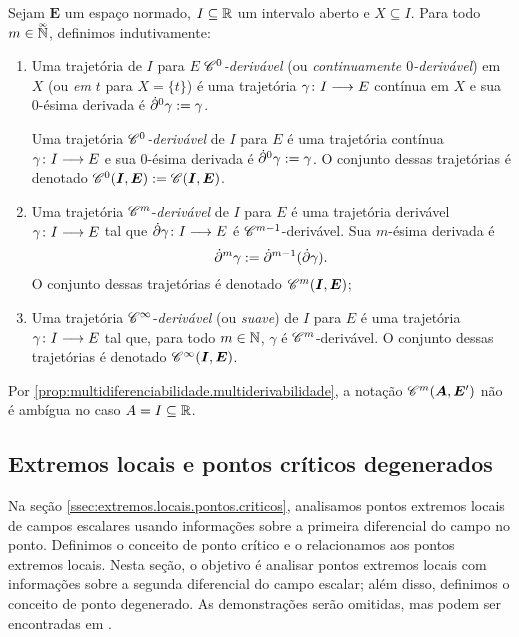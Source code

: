 \begin{definition}
Sejam $\bm E$ um espaço normado, $I \subseteq \mathbb{R}$ um intervalo aberto e $X \subseteq I$. Para todo $m \in \accentset{\infty}{\mathbb{N}}$, definimos indutivamente:
	\begin{enumerate}
	\item Uma trajetória de $I$ para $E$ \emph{$\mathscr{C}^0$-derivável} (ou \emph{continuamente $0$-derivável}) em $X$ (ou \emph{em $t$} para $X=\{t\}$) é uma trajetória $\gamma\colon \allowbreak I \longrightarrow E$ contínua em $X$ e sua $0$-ésima derivada é $\dot{\partial}^0 \gamma := \gamma$.

	Uma trajetória \emph{$\mathscr{C}^0$-derivável} de $I$ para $E$ é uma trajetória contínua $\gamma\colon \allowbreak I \longrightarrow E$ e sua $0$-ésima derivada é $\dot{\partial}^0 \gamma := \gamma$. O conjunto dessas trajetórias é denotado $\mathscr{C}^0(\bm I,\bm E) := \mathscr{C}(\bm I,\bm E)$.

	\item

	Uma trajetória $\mathscr{C}^m$-\emph{derivável} de $I$ para $E$ é uma trajetória derivável $\gamma\colon \allowbreak I \longrightarrow E$ tal que $\dot{\partial} \gamma\colon \allowbreak I \longrightarrow E$ é $\mathscr{C}^{m-1}$-derivável. Sua $m$-ésima derivada é
		\begin{equation*}
		\dot{\partial}^m \gamma := \dot{\partial}^{m-1} (\dot{\partial} \gamma).
		\end{equation*}
	O conjunto dessas trajetórias é denotado $\mathscr{C}^m(\bm I,\bm E)$;

	\item

	Uma trajetória $\mathscr{C}^\infty$-\emph{derivável} (ou \emph{suave}) de $I$ para $E$ é uma trajetória $\gamma\colon \allowbreak I \longrightarrow E$ tal que, para todo $m \in \mathbb{N}$, $\gamma$ é $\mathscr{C}^{m}$-derivável. O conjunto dessas trajetórias é denotado $\mathscr{C}^\infty(\bm I,\bm E)$.
	\end{enumerate}
\end{definition}

Por \ref{prop:multidiferenciabilidade.multiderivabilidade}, a notação $\mathscr{C}^m(\bm A,\bm E')$ não é ambígua no caso $A = I \subseteq \mathbb{R}$.





\subsection{Extremos locais e pontos críticos degenerados}

Na seção \ref{ssec:extremos.locais.pontos.criticos}, analisamos pontos extremos locais de campos escalares usando informações sobre a primeira diferencial do campo no ponto. Definimos o conceito de ponto crítico e o relacionamos aos pontos extremos locais. Nesta seção, o objetivo é analisar pontos extremos locais com informações sobre a segunda diferencial do campo escalar; além disso, definimos o conceito de ponto degenerado. As demonstrações serão omitidas, mas podem ser encontradas em \cite[p.115]{liv:Coleman-CalculusNormedVectorSpaces}.

